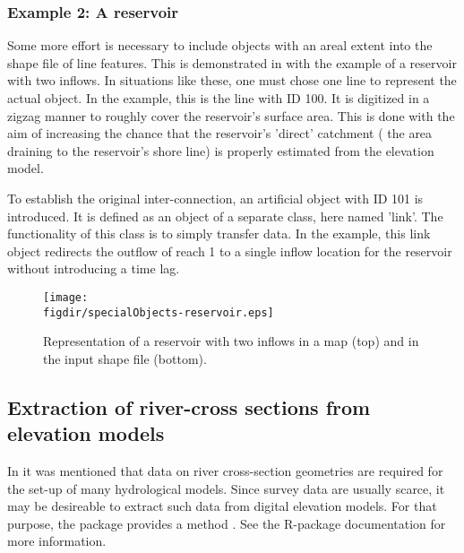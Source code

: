 \subsubsection*{Example 2: A reservoir}
Some more effort is necessary to include objects with an areal extent into the shape file of line features. This is demonstrated in  with the example of a reservoir with two inflows. In situations like these, one must chose one line to represent the actual object. In the example, this is the line with ID 100. It is digitized in a zigzag manner to roughly cover the reservoir's surface area. This is done with the aim of increasing the chance that the reservoir's 'direct' catchment (\ie{} the area draining to the reservoir's shore line) is properly estimated from the elevation model.

To establish the original inter-connection, an artificial object with ID 101 is introduced. It is defined as an object of a separate class, here named 'link'. The functionality of this class is to simply transfer data. In the example, this link object redirects the outflow of reach 1 to a single inflow location for the reservoir without introducing a time lag.

\begin{figure}
  \centering
  \texttt{[image: \\figdir/specialObjects-reservoir.eps]}
  \caption[Representation of a reservoir with two inflows in a map and in the input shape file.]{Representation of a reservoir with two inflows in a map (top) and in the input shape file (bottom). \label{fig:specialObjects-reservoir}}
\end{figure}

\subsection{Extraction of river-cross sections from elevation models} \label{sec:topocatch:hints-xsExtract}

In  it was mentioned that data on river cross-section geometries are required for the set-up of many hydrological models. Since survey data are usually scarce, it may be desireable to extract such data from digital elevation models. For that purpose, the  package provides a method . See the R-package documentation for more information.

